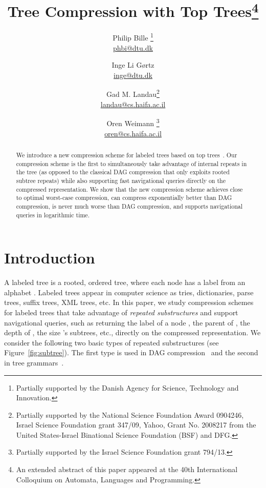 \documentclass [11pt]{article}
\begin{document}
\title{Tree Compression with Top Trees\thanks{An extended abstract of this paper appeared at the 40th International Colloquium on Automata, Languages and Programming.}}
\author{Philip Bille \thanks{Partially supported by the Danish Agency for Science, Technology and Innovation.} \\  \href{mailto:phbi@dtu.dk}{phbi@dtu.dk} \and Inge Li G{\o}rtz\\
 \href{mailto:inge@dtu.dk}{inge@dtu.dk}     \and Gad M. Landau\thanks{Partially supported by the National Science Foundation
Award 0904246, Israel Science Foundation grant 347/09,
Yahoo, Grant No. 2008217 from the United States-Israel
Binational Science Foundation (BSF) and DFG.} \\  \href{mailto:landau@cs.haifa.ac.il}{landau@cs.haifa.ac.il}   \and Oren Weimann  \thanks{Partially supported by  the Israel Science Foundation grant 794/13.} \\  \href{mailto:oren@cs.haifa.ac.il}{oren@cs.haifa.ac.il} }
\date{}

\maketitle


\begin{abstract}

We introduce a new compression scheme for labeled trees based on top trees~\cite{TopTrees}. 
Our  compression scheme is the first to simultaneously take advantage of internal repeats in the tree (as opposed to the classical DAG compression that only exploits rooted subtree repeats) while also supporting fast navigational queries directly on the compressed representation. We show that the new compression scheme achieves close to optimal worst-case compression, can compress exponentially better than DAG compression, is never much worse than DAG compression, and supports navigational queries in logarithmic time.
\end{abstract}




\section{Introduction} 
A labeled tree  is a rooted, ordered tree, where each node has a label from an alphabet . Labeled trees appear in computer science as tries, dictionaries, parse trees, suffix trees, XML trees, etc. In this paper, we study compression schemes for labeled trees that take advantage of \emph{repeated substructures} and support navigational queries, such as returning the label of a node , the parent of , the depth of , the size 's subtrees, etc., directly on the compressed representation. We consider the following two basic types of repeated substructures (see Figure~\ref{fig:subtree}). The first type is used in DAG compression~\cite{BKG03,FKG03} and the second in tree grammars~\cite{Busatto04grammarBasedtree,BLM08,LohreyEtAl,LM06,MB04}.
\end{document}
